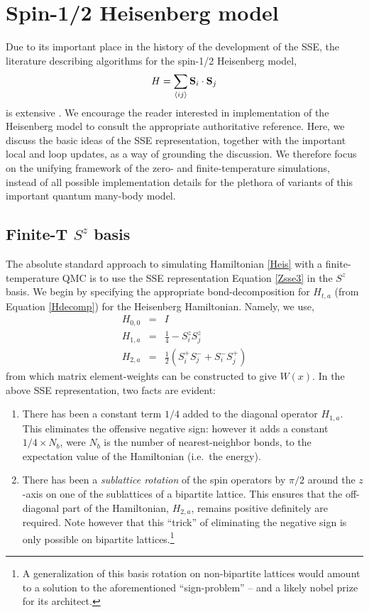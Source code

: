 \documentclass[vecphys]{svmult}
\begin{document}
\section{Spin-1/2 Heisenberg model} \label{Melko:HeisSec}

Due to its important place in the history of the development of the SSE, the literature describing algorithms for the spin-1/2 Heisenberg model,
\begin{equation}
H = \sum_{\langle i j \rangle} {\bf S}_i \cdot {\bf S}_j \label{Heis}
\end{equation}
is extensive \cite{Melko:Handscomb62, Melko:Henelius00, Melko:Sandvik91, Melko:Sandvik99,  Melko:SandvikHeis,Melko:Syljuasen02}.  We encourage the reader interested in implementation of the Heisenberg model to consult the appropriate authoritative reference. Here, we discuss the basic ideas of the SSE representation, together with the important local and loop updates, as a way of grounding the discussion.  We therefore focus on the unifying framework of the zero- and finite-temperature simulations, instead of all possible implementation details for the plethora of variants of this important quantum many-body model.


\subsection{Finite-T $S^z$ basis} \label{HeisfiniteT}

The absolute standard approach to simulating Hamiltonian \ref{Heis} with a finite-temperature QMC is to use the SSE representation Equation \ref{Zsse3} in the $S^z$ basis.  
We begin by specifying the appropriate bond-decomposition for $H_{t,a}$ (from Equation \ref{Hdecomp}) for the Heisenberg Hamiltonian.
Namely, we use,
\begin{eqnarray}
H_{0,0} &=&I \\
H_{1,a} &=& \frac{1}{4} - S^z_i S^z_j \label{H1a} \label{diagB} \\
H_{2,a} &=& \frac{1}{2} (S^+_i S^-_j + S^-_i S^+_j) \label{odB}
\end{eqnarray}
from which matrix element-weights can be constructed to give $W(x)$.  In the above SSE representation, two facts are evident:
\begin{enumerate}
\item There has been a constant term $1/4$ added to the diagonal operator $H_{1,a}$.  This eliminates the offensive negative sign: however it adds a constant $1/4 \times N_b$, were $N_b$ is the number of nearest-neighbor bonds, to the expectation value of the Hamiltonian (i.e.~the energy).
\item There has been a {\em sublattice rotation} of the spin operators by $\pi/2$ around the $z$-axis on one of the sublattices of a bipartite lattice.  This ensures that the off-diagonal part of the Hamiltonian, $H_{2,a}$, remains positive definitely are required.  Note however that this ``trick'' of eliminating the negative sign is only possible on bipartite lattices.\footnote{A generalization of this basis rotation on non-bipartite lattices would amount to a solution to the aforementioned ``sign-problem'' -- and a likely nobel prize for its architect.}
\end{enumerate}
\end{document}
